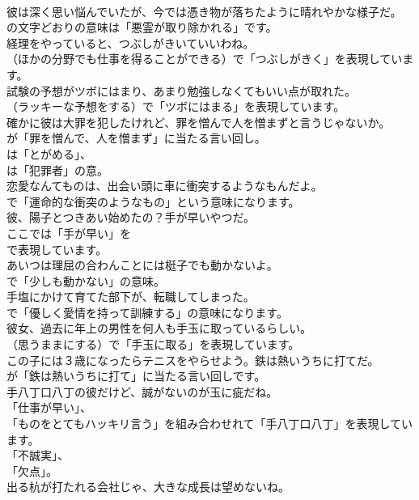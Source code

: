 \documentclass[8pt]{extreport}
\begin{document}
\begin{CJK}{UTF8}{min}
\\	彼は深く思い悩んでいたが、今では憑き物が落ちたように晴れやかな様子だ。 
\\	の文字どおりの意味は「悪霊が取り除かれる」です。	
\\	経理をやっていると、つぶしがきいていいわね。 
\\	（ほかの分野でも仕事を得ることができる）で「つぶしがきく」を表現しています。	
\\	試験の予想がツボにはまり、あまり勉強しなくてもいい点が取れた。 
\\	（ラッキーな予想をする）で「ツボにはまる」を表現しています。	
\\	確かに彼は大罪を犯したけれど、罪を憎んで人を憎まずと言うじゃないか。 
\\	が「罪を憎んで、人を憎まず」に当たる言い回し。
\\	は「とがめる」、
\\	は「犯罪者」の意。	
\\	恋愛なんてものは、出会い頭に車に衝突するようなもんだよ。 
\\	で「運命的な衝突のようなもの」という意味になります。	
\\	彼、陽子とつきあい始めたの？手が早いやつだ。 
\\	ここでは「手が早い」を 
\\	で表現しています。	
\\	あいつは理屈の合わんことには梃子でも動かないよ。 
\\	で「少しも動かない」の意味。	
\\	手塩にかけて育てた部下が、転職してしまった。 
\\	で「優しく愛情を持って訓練する」の意味になります。	
\\	彼女、過去に年上の男性を何人も手玉に取っているらしい。 
\\	（思うままにする）で「手玉に取る」を表現しています。	
\\	この子には３歳になったらテニスをやらせよう。鉄は熱いうちに打てだ。 
\\	が「鉄は熱いうちに打て」に当たる言い回しです。	
\\	手八丁口八丁の彼だけど、誠がないのが玉に疵だね。 
\\	「仕事が早い」、
\\	「ものをとてもハッキリ言う」を組み合わせれて「手八丁口八丁」を表現しています。
\\	「不誠実」、
\\	「欠点」。	
\\	出る杭が打たれる会社じゃ、大きな成長は望めないね。 

\end{CJK}
\end{document}
